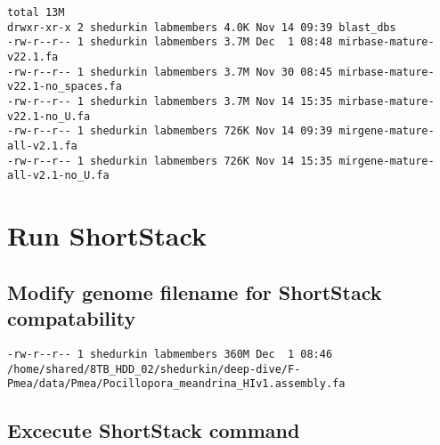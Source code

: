 \documentclass[
]{article}
\newenvironment{Shaded}{\begin{snugshade}}{\end{snugshade}}
\newcommand{\AttributeTok}[1]{\textcolor[rgb]{0.77,0.63,0.00}{#1}}
\newcommand{\BuiltInTok}[1]{#1}
\newcommand{\CommentTok}[1]{\textcolor[rgb]{0.56,0.35,0.01}{\textit{#1}}}
\newcommand{\FunctionTok}[1]{\textcolor[rgb]{0.00,0.00,0.00}{#1}}
\newcommand{\NormalTok}[1]{#1}
\newcommand{\VariableTok}[1]{\textcolor[rgb]{0.00,0.00,0.00}{#1}}
\begin{document}
\begin{verbatim}
total 13M
drwxr-xr-x 2 shedurkin labmembers 4.0K Nov 14 09:39 blast_dbs
-rw-r--r-- 1 shedurkin labmembers 3.7M Dec  1 08:48 mirbase-mature-v22.1.fa
-rw-r--r-- 1 shedurkin labmembers 3.7M Nov 30 08:45 mirbase-mature-v22.1-no_spaces.fa
-rw-r--r-- 1 shedurkin labmembers 3.7M Nov 14 15:35 mirbase-mature-v22.1-no_U.fa
-rw-r--r-- 1 shedurkin labmembers 726K Nov 14 09:39 mirgene-mature-all-v2.1.fa
-rw-r--r-- 1 shedurkin labmembers 726K Nov 14 15:35 mirgene-mature-all-v2.1-no_U.fa
\end{verbatim}

\hypertarget{run-shortstack}{%
\section{Run ShortStack}\label{run-shortstack}}

\hypertarget{modify-genome-filename-for-shortstack-compatability}{%
\subsection{Modify genome filename for ShortStack compatability}\label{modify-genome-filename-for-shortstack-compatability}}

\begin{Shaded}
\end{Shaded}

\begin{verbatim}
-rw-r--r-- 1 shedurkin labmembers 360M Dec  1 08:46 /home/shared/8TB_HDD_02/shedurkin/deep-dive/F-Pmea/data/Pmea/Pocillopora_meandrina_HIv1.assembly.fa
\end{verbatim}

\hypertarget{excecute-shortstack-command}{%
\subsection{Excecute ShortStack command}\label{excecute-shortstack-command}}
\end{document}
